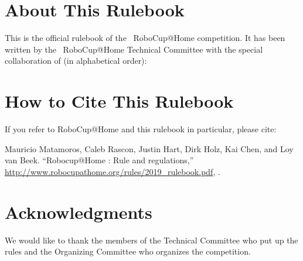 


\section*{About This Rulebook}
This is the official rulebook of the \YEAR ~RoboCup@Home competition.
It has been written by the \YEAR ~RoboCup@Home Technical Committee with the special collaboration of (in alphabetical order):



\section*{How to Cite This Rulebook}
If you refer to RoboCup@Home and this rulebook in particular, please cite:

Mauricio Matamoros, Caleb Rascon, Justin Hart, Dirk Holz, Kai Chen, and Loy van Beek.
\enquote{Robocup@Home \YEAR: Rule and regulations,}
\url{http://www.robocupathome.org/rules/2019_rulebook.pdf}, \YEAR.

\begin{center}
\begin{minipage}{0.8\textwidth}
	\footnotesize%
	
\end{minipage}
\end{center}

\section*{Acknowledgments}
\label{sec:acknowledgments}
We would like to thank the members of the Technical Committee who put up the rules and the Organizing Committee who organizes the competition.

